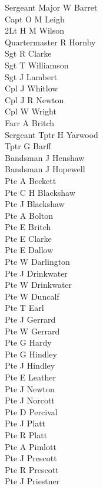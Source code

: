 \begin{multicols}{2}
  \noindent
  Sergeant Major W Barret \\
  Capt O M Leigh \\
  2Lt H M Wilson \\
  Quartermaster R Hornby \\
  Sgt R Clarke \\
  Sgt T Williamson \\
  Sgt J Lambert \\
  Cpl J Whitlow \\
  Cpl J R Newton \\
  Cpl W Wright \\
  Farr A Britch \\
  Sergeant Tptr H Yarwood \\
  Tptr G Barff \\
  Bandsman J Henshaw \\
  Bandsman J Hopewell \\
  Pte A Beckett \\
  Pte C H Blackshaw \\
  Pte J Blackshaw \\
  Pte A Bolton \\
  Pte E Britch \\
  Pte E Clarke \\
  Pte E Dallow \\
  Pte W Darlington \\
  Pte J Drinkwater \\
  Pte W Drinkwater \\
  Pte W Duncalf \\
  Pte T Earl \\
  Pte J Gerrard \\
  Pte W Gerrard \\
  Pte G Hardy \\
  Pte G Hindley \\
  Pte J Hindley \\
  Pte E Leather \\
  Pte J Newton \\
  Pte J Norcott \\
  Pte D Percival \\
  Pte J Platt \\
  Pte R Platt \\
  Pte A Pimlott \\
  Pte J Prescott \\
  Pte R Prescott \\
  Pte J Priestner \\

\end{multicols}
